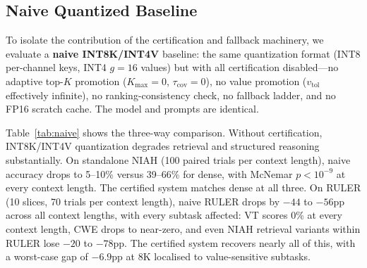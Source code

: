 \documentclass[10pt,twocolumn,a4paper]{article}
\theoremstyle{definition}
\theoremstyle{remark}
\begin{document}
\subsection{Naive Quantized Baseline}
\label{sec:naive}

To isolate the contribution of the certification and fallback machinery, we evaluate a \textbf{naive INT8K/INT4V} baseline: the same quantization format (INT8 per-channel keys, INT4 $g{=}16$ values) but with all certification disabled---no adaptive top-$K$ promotion ($K_{\max}{=}0$, $\tau_{\mathrm{cov}}{=}0$), no value promotion ($v_{\mathrm{tol}}$ effectively infinite), no ranking-consistency check, no fallback ladder, and no FP16 scratch cache.  The model and prompts are identical.

Table~\ref{tab:naive} shows the three-way comparison.  Without certification, INT8K/INT4V quantization degrades retrieval and structured reasoning substantially.  On standalone NIAH (100 paired trials per context length), naive accuracy drops to 5--10\% versus 39--66\% for dense, with McNemar $p < 10^{-9}$ at every context length.  The certified system matches dense at all three.  On RULER (10 slices, 70 trials per context length), naive RULER drops by $-44$ to $-56$pp across all context lengths, with every subtask affected: VT scores 0\% at every context length, CWE drops to near-zero, and even NIAH retrieval variants within RULER lose $-20$ to $-78$pp.  The certified system recovers nearly all of this, with a worst-case gap of $-6.9$pp at 8K localised to value-sensitive subtasks.
\end{document}
